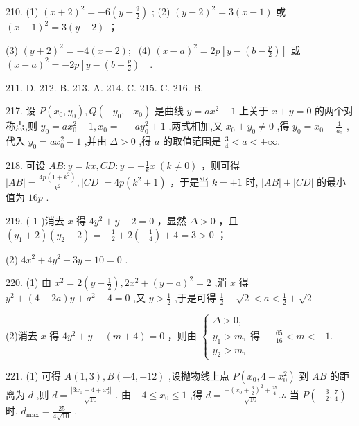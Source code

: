 \documentclass[10pt]{article}
\begin{document}
210. (1) \({\left( x + 2\right) }^{2} =  - 6\left( {y - \frac{9}{2}}\right)\) ; (2) \({\left( y - 2\right) }^{2} = 3\left( {x - 1}\right)\) 或 \({\left( x - 1\right) }^{2} = 3\left( {y - 2}\right)\) ；

(3) \({\left( y + 2\right) }^{2} =  - 4\left( {x - 2}\right) ;\;\) (4) \({\left( x - a\right) }^{2} = {2p}\left\lbrack  {y - \left( {b - \frac{p}{2}}\right) }\right\rbrack\) 或 \({\left( x - a\right) }^{2} =  - {2p}\left\lbrack  {y - \left( {b + \frac{p}{2}}\right) }\right\rbrack\) .

211. D. 212. B. 213. A. 214. C. 215. C. 216. B.

217. 设 \(P\left( {{x}_{0},{y}_{0}}\right) ,Q\left( {-{y}_{0}, - {x}_{0}}\right)\) 是曲线 \(y = a{x}^{2} - 1\) 上关于 \(x + y = 0\) 的两个对称点,则 \({y}_{0} = a{x}_{0}^{2} - 1,{x}_{0} = \; - a{y}_{0}^{2} + 1\) ,两式相加,又 \({x}_{0} + {y}_{0} \neq  0\) ,得 \({y}_{0} = {x}_{0} - \frac{1}{{a}_{0}}\) ,代入 \({y}_{0} = a{x}_{0}^{2} - 1\) ,并由 \(\Delta  > 0\) ,得 \(a\) 的取值范围是 \(\frac{3}{4} < a <  + \infty .\)

218. 可设 \({AB} : y = {kx},{CD} : y =  - \frac{1}{k}x\;\left( {k \neq  0}\right)\) ，则可得 \(\left| {AB}\right|  = \frac{{4p}\left( {1 + {k}^{2}}\right) }{{k}^{2}},\left| {CD}\right|  = {4p}\left( {{k}^{2} + 1}\right)\) ，于是当 \(k =  \pm  1\) 时, \(\left| {AB}\right|  + \left| {CD}\right|\) 的最小值为 \({16p}\) .

219. ( 1 )消去 \(x\) 得 \(4{y}^{2} + y - 2 = 0\) ，显然 \(\Delta  > 0\) ，且 \(\left( {{y}_{1} + 2}\right) \left( {{y}_{2} + 2}\right)  =  - \frac{1}{2} + 2\left( {-\frac{1}{4}}\right)  + 4 = 3 > 0\) ；

(2) \(4{x}^{2} + 4{y}^{2} - {3y} - {10} = 0\) .

220. (1) 由 \({x}^{2} = 2\left( {y - \frac{1}{2}}\right) ,2{x}^{2} + {\left( y - a\right) }^{2} = 2\) ,消 \(x\) 得 \({y}^{2} + \left( {4 - {2a}}\right) y + {a}^{2} - 4 = 0\) ,又 \(y > \frac{1}{2}\) ,于是可得 \(\frac{1}{2} - \sqrt{2} < a < \frac{1}{2} + \sqrt{2}\)

(2)消去 \(x\) 得 \(4{y}^{2} + y - \left( {m + 4}\right)  = 0\) ，则由 \(\left\{  \begin{array}{l} \Delta  > 0, \\  {y}_{1} > m,\text{ 得 } - \frac{65}{16} < m <  - 1. \\  {y}_{2} > m, \end{array}\right.\)

221. (1) 可得 \(A\left( {1,3}\right) ,B\left( {-4, - {12}}\right)\) ,设抛物线上点 \(P\left( {{x}_{0},4 - {x}_{0}^{2}}\right)\) 到 \({AB}\) 的距离为 \(d\) ,则 \(d = \frac{\left| 3{x}_{0} - 4 + {x}_{0}^{2}\right| }{\sqrt{10}}\) . 由 \(- 4 \leq  {x}_{0} \leq  1\) ,得 \(d = \frac{-{\left( {x}_{0} + \frac{3}{2}\right) }^{2} + \frac{25}{4}}{\sqrt{10}}.\therefore\) 当 \(P\left( {-\frac{3}{2},\frac{7}{4}}\right)\) 时, \({d}_{\max } = \frac{25}{4\sqrt{10}}\) .
\end{document}
